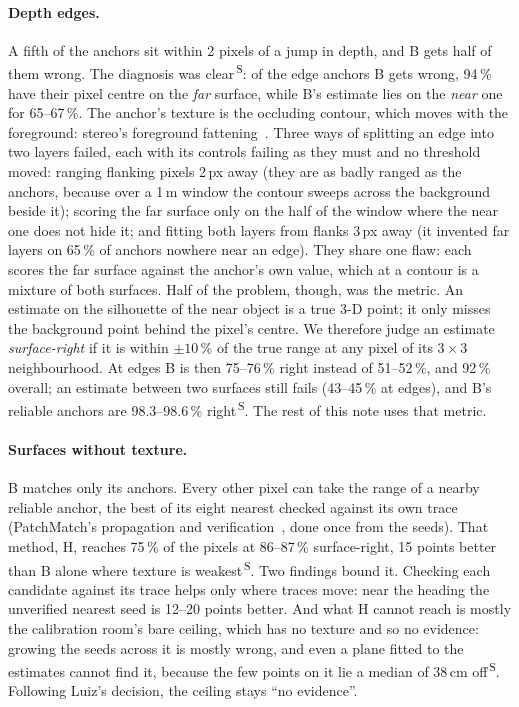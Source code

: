 \documentclass[11pt,a4paper]{article}
\newcommand{\src}[1]{\textsuperscript{\,#1}}
\newcommand{\SB}{\src{S}}   %
\begin{document}
\paragraph{Depth edges.} A fifth of the anchors sit within 2 pixels of a jump in depth, and B gets half of them wrong.
The diagnosis was clear\SB: of the edge anchors B gets wrong, 94\,\% have their pixel centre on the \emph{far} surface,
while B's estimate lies on the \emph{near} one for 65--67\,\%. The anchor's texture is the occluding contour, which moves
with the foreground: stereo's foreground fattening~\cite{scharstein}. Three ways of splitting an edge into two layers
failed, each with its controls failing as they must and no threshold moved: ranging flanking pixels 2\,px away (they are
as badly ranged as the anchors, because over a 1\,m window the contour sweeps across the background beside it); scoring
the far surface only on the half of the window where the near one does not hide it; and fitting both layers from flanks
3\,px away (it invented far layers on 65\,\% of anchors nowhere near an edge). They share one flaw: each scores the far
surface against the anchor's own value, which at a contour is a mixture of both surfaces. Half of the problem, though, was
the metric. An estimate on the silhouette of the near object is a true 3-D point; it only misses the background point
behind the pixel's centre. We therefore judge an estimate \emph{surface-right} if it is within $\pm10$\,\% of the true range at any
pixel of its $3\times3$ neighbourhood. At edges B is then 75--76\,\% right instead of 51--52\,\%, and 92\,\% overall; an
estimate between two surfaces still fails (43--45\,\% at edges), and B's reliable anchors are 98.3--98.6\,\% right\SB. The
rest of this note uses that metric.

\paragraph{Surfaces without texture.} B matches only its anchors. Every other pixel can take the range of a nearby reliable
anchor, the best of its eight nearest checked against its own trace (PatchMatch's propagation and
verification~\cite{patchmatch}, done once from the seeds). That method, H, reaches 75\,\% of the pixels at 86--87\,\%
surface-right, 15 points better than B alone where texture is weakest\SB. Two findings bound it. Checking each candidate
against its trace helps only where traces move: near the heading the unverified nearest seed is 12--20 points better.
And what H cannot reach is mostly the calibration room's bare ceiling, which has no texture and so no evidence: growing
the seeds across it is mostly wrong, and even a plane fitted to the estimates cannot find it, because the few points on it
lie a median of 38\,cm off\SB. Following Luiz's decision, the ceiling stays ``no evidence''.
\end{document}
